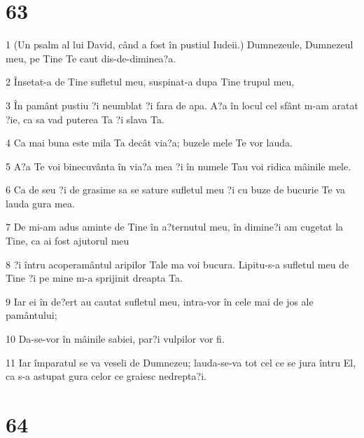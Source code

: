 \chapter{63}

\par 1 (Un psalm al lui David, când a fost în pustiul Iudeii.) Dumnezeule, Dumnezeul meu, pe Tine Te caut dis-de-diminea?a.
\par 2 Însetat-a de Tine sufletul meu, suspinat-a dupa Tine trupul meu,
\par 3 În pamânt pustiu ?i neumblat ?i fara de apa. A?a în locul cel sfânt m-am aratat ?ie, ca sa vad puterea Ta ?i slava Ta.
\par 4 Ca mai buna este mila Ta decât via?a; buzele mele Te vor lauda.
\par 5 A?a Te voi binecuvânta în via?a mea ?i în numele Tau voi ridica mâinile mele.
\par 6 Ca de seu ?i de grasime sa se sature sufletul meu ?i cu buze de bucurie Te va lauda gura mea.
\par 7 De mi-am adus aminte de Tine în a?ternutul meu, în dimine?i am cugetat la Tine, ca ai fost ajutorul meu
\par 8 ?i întru acoperamântul aripilor Tale ma voi bucura. Lipitu-s-a sufletul meu de Tine ?i pe mine m-a sprijinit dreapta Ta.
\par 9 Iar ei în de?ert au cautat sufletul meu, intra-vor în cele mai de jos ale pamântului;
\par 10 Da-se-vor în mâinile sabiei, par?i vulpilor vor fi.
\par 11 Iar împaratul se va veseli de Dumnezeu; lauda-se-va tot cel ce se jura întru El, ca s-a astupat gura celor ce graiesc nedrepta?i.

\chapter{64}

